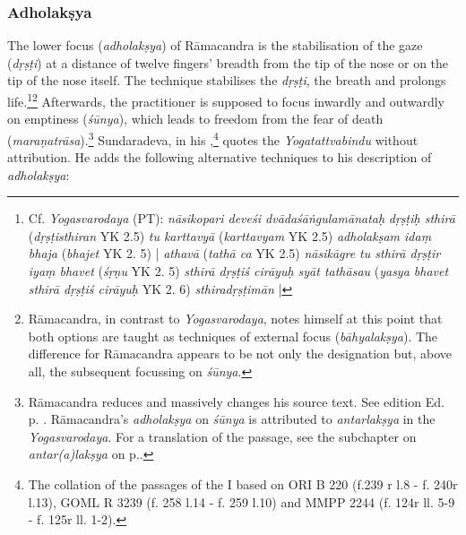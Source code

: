 \subsubsection{Adholakṣya}
The lower focus (\textit{adholakṣya}) of Rāmacandra is the stabilisation of the gaze (\textit{dṛṣṭi}) at a distance of twelve fingers' breadth from the tip of the nose or on the tip of the nose itself. The technique stabilises the \textit{dṛṣṭi}, the breath and prolongs life.\footnote{Cf. \emph{Yogasvarodaya} (PT): \textit{nāsikopari deveśi dvādaśāṅgulamānataḥ} \textit{dṛṣṭiḥ sthirā} (\textit{dṛṣṭisthiran} YK 2.5) \textit{tu karttavyā} (\textit{karttavyam} YK 2.5) \textit{adholakṣam idaṃ bhaja} (\textit{bhajet} YK 2. 5) | \textit{athavā} (\textit{tathā ca} YK 2.5) \textit{nāsikāgre tu sthirā dṛṣṭir iyaṃ bhavet} (\textit{śṛṇu} YK 2. 5) \textit{sthirā dṛṣṭiś cirāyuḥ syāt tathāsau} (\textit{yasya bhavet sthirā dṛṣṭiś cirāyuḥ} YK 2. 6) \textit{sthiradṛṣṭimān} |}\footnote{Rāmacandra, in contrast to \textit{Yogasvarodaya}, notes himself at this point that both options are taught as techniques of external focus (\textit{bāhyalakṣya}). The difference for Rāmacandra appears to be not only the designation but, above all, the subsequent focussing on \textit{śūnya}.} Afterwards, the practitioner is supposed to focus inwardly and outwardly on emptiness (\textit{śūnya}), which leads to freedom from the fear of death (\textit{maraṇatrāsa}).\footnote{Rāmacandra reduces and massively changes his source text. See edition  Ed. p. \pageref{adholaksya}. Rāmacandra's \textit{adholakṣya} on \textit{śūnya} is attributed to \textit{antarlakṣya} in the \textit{Yogasvarodaya}. For a translation of the passage, see the subchapter on \textit{antar(a)lakṣya} on p.\pageref{antarsvayotrans}.} 
\label{samketaadd1}
Sundaradeva, in his ,\footnote{The collation of the passages of the  I based on ORI B 220 (f.239 r l.8 - f. 240r l.13), GOML R 3239 (f. 258 l.14 - f. 259 l.10) and MMPP 2244 (f. 124r ll. 5-9 - f. 125r ll. 1-2).} quotes the \textit{Yogatattvabindu} without attribution. He adds the following alternative techniques to his description of \textit{adholakṣya}:\nocite{hathasamketacandrikachennai}\nocite{hathasamketacandrikajodhpur}\nocite{hathasamketacandrikamysore}\label{sanketaextra}
